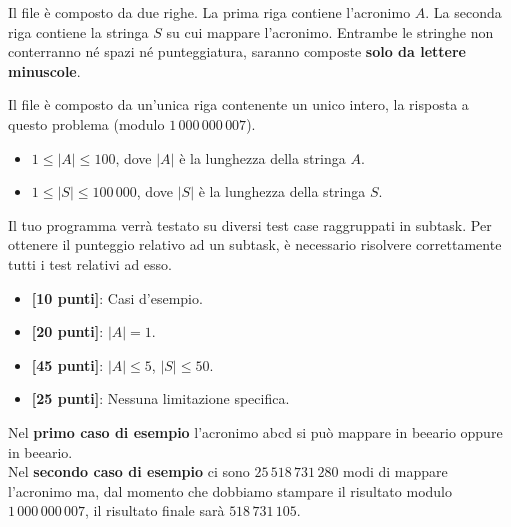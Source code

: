 \InputFile
Il file  è composto da due righe. La prima riga contiene l'acronimo $A$. La seconda riga contiene la stringa $S$ su cui mappare l'acronimo. Entrambe le stringhe non conterranno né spazi né punteggiatura, saranno composte \textbf{solo da lettere minuscole}.

\OutputFile
Il file \outputfile{} è composto da un'unica riga contenente un unico intero, la risposta a questo problema (modulo $1\,000\,000\,007$).


\Constraints
\begin{itemize}[nolistsep, itemsep=2mm]
  \item $1 \le |A| \le 100$, dove $|A|$ è la lunghezza della stringa $A$.
  \item $1 \le |S| \le 100\,000$, dove $|S|$ è la lunghezza della stringa $S$.
\end{itemize}

\Scoring
Il tuo programma verrà testato su diversi test case raggruppati in subtask.
Per ottenere il punteggio relativo ad un subtask, è necessario risolvere
correttamente tutti i test relativi ad esso.

\begin{itemize}[nolistsep,itemsep=2mm]
  \item \textbf{ [10 punti]}: Casi d'esempio.
  \item \textbf{ [20 punti]}: $|A| = 1$.
  \item \textbf{ [45 punti]}: $|A| \leq 5$, $|S| \leq 50$.
  \item \textbf{ [25 punti]}: Nessuna limitazione specifica.
\end{itemize}



\Examples
\begin{example}
%
%
%
\end{example}


\Explanation
Nel \textbf{primo caso di esempio} l'acronimo abcd si può mappare in beeario oppure in beeario.\\[2mm]
Nel \textbf{secondo caso di esempio} ci sono $25\,518\,731\,280$ modi di mappare l'acronimo ma, dal momento che dobbiamo stampare il risultato modulo $1\,000\,000\,007$, il risultato finale sarà $518\,731\,105$.
